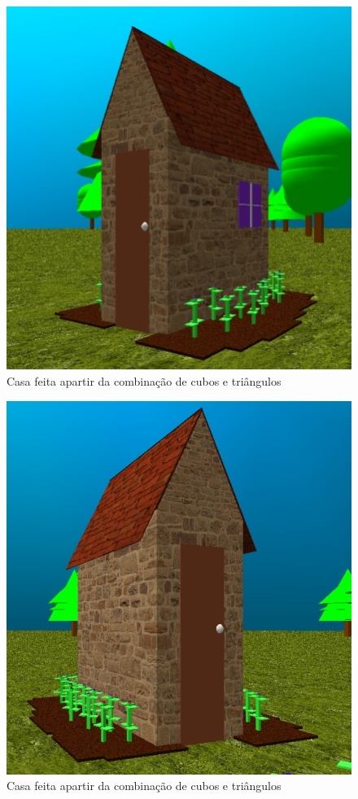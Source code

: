 \documentclass[
	12pt,				%
	openright,			%
	a4paper,			%
	english,			%
	french,				%
	spanish,			%
	brazil,				%
	]{abntex2}
\begin{document}
\begin{figure}[H]
\centering 
\caption{Casa feita apartir da combinação de cubos e triângulos } \label{casa}
\includegraphics[scale=0.6]{imagens/casa.png}
\end{figure}

\begin{figure}[H]
\centering 
\caption{Casa feita apartir da combinação de cubos e triângulos } \label{casa2}
\includegraphics[scale=0.6]{imagens/casa2.png}
\end{figure}
\end{document}
